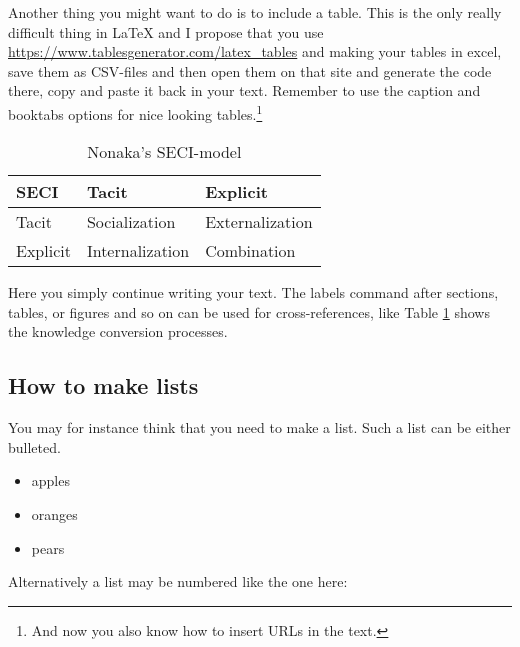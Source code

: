 Another thing you might want to do is to include a table. This is the only really difficult thing in LaTeX and I propose that you use \url{https://www.tablesgenerator.com/latex_tables} and making your tables in excel, save them as CSV-files and then open them on that site and generate the code there, copy and paste it back in your text. Remember to use the caption and booktabs options for nice looking tables.\footnote{And now you also know how to insert URLs in the text.} 


\begin{table}[h]
\centering
\begin{tabular}{@{}lll@{}}
\toprule
\textbf{SECI} & Tacit           & Explicit        \\ \midrule
Tacit         & Socialization   & Externalization \\
Explicit      & Internalization & Combination     \\ \bottomrule
\end{tabular}
\caption{Nonaka's SECI-model}
\label{tab:seci}
\end{table}

Here you simply continue writing your text. The labels command after sections, tables, or figures and so on can be used for cross-references, like Table \ref{tab:seci} shows the knowledge conversion processes.

\subsection{How to make lists}

You may for instance think that you need to make a list. Such a list can be either bulleted.

\begin{itemize}
	\item apples
	\item oranges
	\item pears
\end{itemize}

Alternatively a list may be numbered like the one here:

